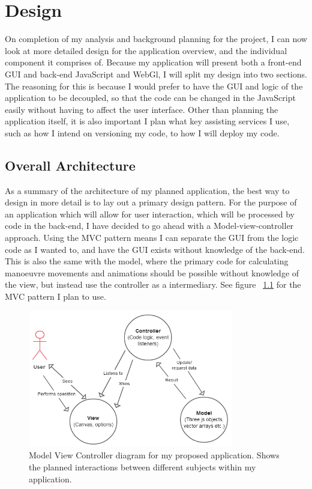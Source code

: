 \chapter{Design}
On completion of my analysis and background planning for the project, I can now look at more detailed design for the application overview, and the individual component it comprises of. Because my application will present both a front-end GUI and back-end JavaScript and WebGl, I will split my design into two sections. The reasoning for this is because I would prefer to have the GUI and logic of the application to be decoupled, so that the code can be changed in the JavaScript easily without having to affect the user interface. Other than planning the application itself, it is also important I plan what key assisting services I use, such as how I intend on versioning my code, to how I will deploy my code.

\section{Overall Architecture}
As a summary of the architecture of my planned application, the best way to design in more detail is to lay out a primary design pattern. For the purpose of an application which will allow for user interaction, which will be processed by code in the back-end, I have decided to go ahead with a Model-view-controller approach. Using the MVC pattern means I can separate the GUI from the logic code as I wanted to, and have the GUI exists without knowledge of the back-end. This is also the same with the model, where the primary code for calculating manoeuvre movements and animations should be possible without knowledge of the view, but instead use the controller as a intermediary. See figure ~\ref{fig:mvc} for the MVC pattern I plan to use. 

\begin{figure}[h!]
  \centering
      \includegraphics[width=0.8\textwidth]{images/mvc.png}
  \caption{Model View Controller diagram for my proposed application. Shows the planned interactions between different subjects within my application.}
  \label{fig:mvc}
\end{figure}

